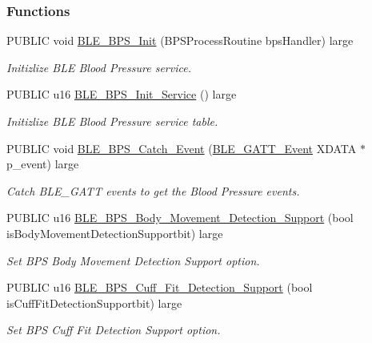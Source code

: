\subsubsection*{Functions}
\begin{DoxyCompactItemize}
\item 
P\+U\+B\+L\+IC void \hyperlink{group___b_l_e___b_p_s_ga4a9e2f52f1dec0a63c97b3d0150be5cd}{B\+L\+E\+\_\+\+B\+P\+S\+\_\+\+Init} (B\+P\+S\+Process\+Routine bps\+Handler) large
\begin{DoxyCompactList}\small\item\em Initizlize B\+LE Blood Pressure service. \end{DoxyCompactList}\item 
P\+U\+B\+L\+IC u16 \hyperlink{group___b_l_e___b_p_s_gacbd9a73c10d0917408563202e3733e15}{B\+L\+E\+\_\+\+B\+P\+S\+\_\+\+Init\+\_\+\+Service} () large
\begin{DoxyCompactList}\small\item\em Initizlize B\+LE Blood Pressure service table. \end{DoxyCompactList}\item 
P\+U\+B\+L\+IC void \hyperlink{group___b_l_e___b_p_s_ga434675153f04cfb41dc08fbf107557f1}{B\+L\+E\+\_\+\+B\+P\+S\+\_\+\+Catch\+\_\+\+Event} (\hyperlink{struct_b_l_e___g_a_t_t___event}{B\+L\+E\+\_\+\+G\+A\+T\+T\+\_\+\+Event} X\+D\+A\+TA $\ast$p\+\_\+event) large
\begin{DoxyCompactList}\small\item\em Catch B\+L\+E\+\_\+\+G\+A\+TT events to get the Blood Pressure events. \end{DoxyCompactList}\item 
P\+U\+B\+L\+IC u16 \hyperlink{group___b_l_e___b_p_s_ga629eba05d58599d765d7014314f44266}{B\+L\+E\+\_\+\+B\+P\+S\+\_\+\+Body\+\_\+\+Movement\+\_\+\+Detection\+\_\+\+Support} (bool is\+Body\+Movement\+Detection\+Supportbit) large
\begin{DoxyCompactList}\small\item\em Set B\+PS Body Movement Detection Support option. \end{DoxyCompactList}\item 
P\+U\+B\+L\+IC u16 \hyperlink{group___b_l_e___b_p_s_ga58b37c249ef1273bcc800562ae72f8c2}{B\+L\+E\+\_\+\+B\+P\+S\+\_\+\+Cuff\+\_\+\+Fit\+\_\+\+Detection\+\_\+\+Support} (bool is\+Cuff\+Fit\+Detection\+Supportbit) large
\begin{DoxyCompactList}\small\item\em Set B\+PS Cuff Fit Detection Support option. \end{DoxyCompactList}\item 

\end{DoxyCompactItemize}
